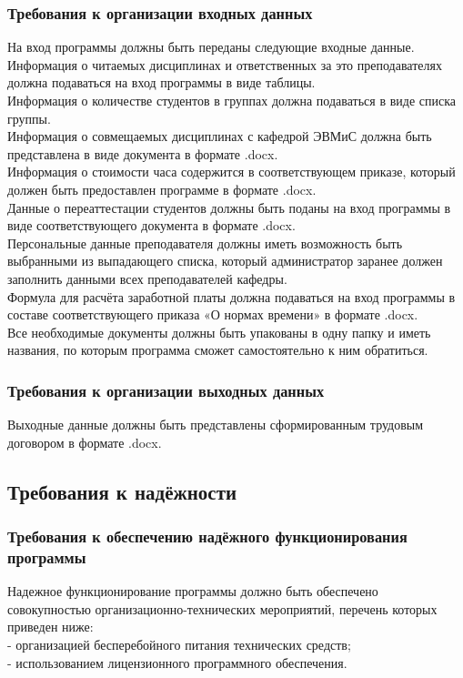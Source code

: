 \documentclass{article}
\begin{document}
        \subsubsection{Требования к организации входных данных}
        На вход программы должны быть переданы следующие входные данные.\\
        Информация о читаемых дисциплинах и ответственных за это преподавателях должна подаваться на вход программы в виде таблицы.\\
        Информация о количестве студентов в группах должна подаваться в виде списка группы.\\
        Информация о совмещаемых дисциплинах с кафедрой ЭВМиС должна быть представлена в виде документа в формате .docx.\\
        Информация о стоимости часа содержится в соответствующем приказе, который должен быть предоставлен программе в формате .docx.\\
        Данные о переаттестации студентов должны быть поданы на вход программы в виде соответствующего документа в формате .docx.\\
        Персональные данные преподавателя должны иметь возможность быть выбранными из выпадающего списка, который администратор заранее должен заполнить данными всех преподавателей кафедры.\\
        Формула для расчёта заработной платы должна подаваться на вход программы в составе соответствующего приказа «О нормах времени» в формате .docx.\\
        Все необходимые документы должны быть упакованы в одну папку и иметь названия, по которым программа сможет самостоятельно к ним обратиться.\\
        
        \subsubsection{Требования к организации выходных данных}
        Выходные данные должны быть представлены сформированным трудовым договором в формате .docx.
        
    \subsection{Требования к надёжности}
        \subsubsection{Требования к обеспечению надёжного функционирования программы}
        Надежное функционирование программы должно быть обеспечено совокупностью организационно-технических мероприятий, перечень которых приведен ниже:\\
        -	организацией бесперебойного питания технических средств;\\
        -	использованием лицензионного программного обеспечения.
        
\end{document}
